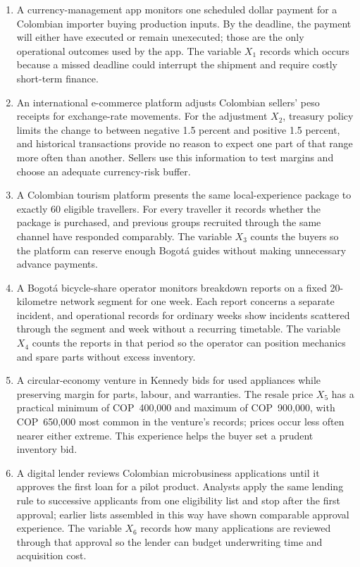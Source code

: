 	\begin{enumerate}
		
		\item
		A currency-management app monitors one scheduled dollar payment for a Colombian importer buying production inputs. By the deadline, the payment will either have executed or remain unexecuted; those are the only operational outcomes used by the app. The variable \(X_1\) records which occurs because a missed deadline could interrupt the shipment and require costly short-term finance.
		
		\item
		An international e-commerce platform adjusts Colombian sellers' peso receipts for exchange-rate movements. For the adjustment \(X_2\), treasury policy limits the change to between negative 1.5 percent and positive 1.5 percent, and historical transactions provide no reason to expect one part of that range more often than another. Sellers use this information to test margins and choose an adequate currency-risk buffer.
		
		\item
		A Colombian tourism platform presents the same local-experience package to exactly 60 eligible travellers. For every traveller it records whether the package is purchased, and previous groups recruited through the same channel have responded comparably. The variable \(X_3\) counts the buyers so the platform can reserve enough Bogotá guides without making unnecessary advance payments.
		
		\item
		A Bogotá bicycle-share operator monitors breakdown reports on a fixed 20-kilometre network segment for one week. Each report concerns a separate incident, and operational records for ordinary weeks show incidents scattered through the segment and week without a recurring timetable. The variable \(X_4\) counts the reports in that period so the operator can position mechanics and spare parts without excess inventory.
		
		\item
		A circular-economy venture in Kennedy bids for used appliances while preserving margin for parts, labour, and warranties. The resale price \(X_5\) has a practical minimum of COP~400,000 and maximum of COP~900,000, with COP~650,000 most common in the venture's records; prices occur less often nearer either extreme. This experience helps the buyer set a prudent inventory bid.
		
		\item
		A digital lender reviews Colombian microbusiness applications until it approves the first loan for a pilot product. Analysts apply the same lending rule to successive applicants from one eligibility list and stop after the first approval; earlier lists assembled in this way have shown comparable approval experience. The variable \(X_6\) records how many applications are reviewed through that approval so the lender can budget underwriting time and acquisition cost.
		

\end{enumerate}
